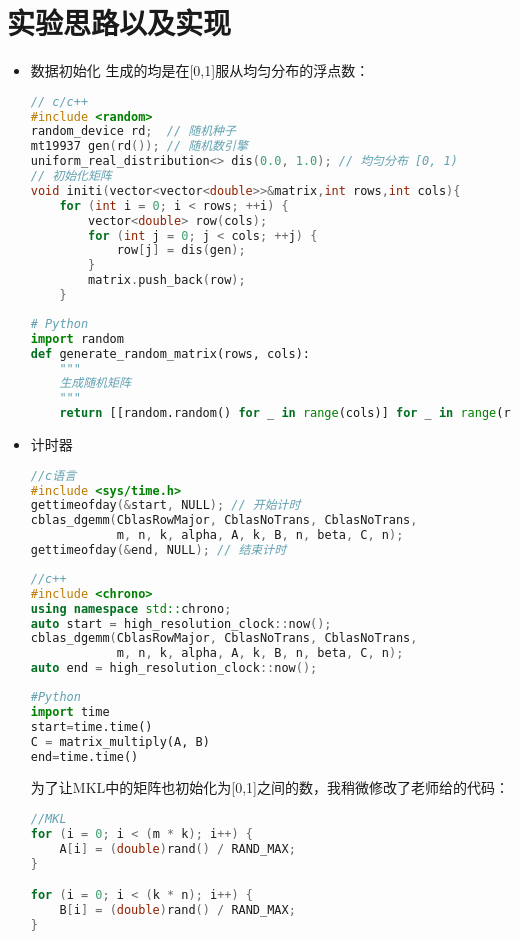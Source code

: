 \documentclass{SYSUReport}
\begin{document}
\section{实验思路以及实现}
\begin{itemize}
    \item 数据初始化
    生成的均是在[0,1]服从均匀分布的浮点数：
    \begin{lstlisting}[language=c]
// c/c++
#include <random>
random_device rd;  // 随机种子
mt19937 gen(rd()); // 随机数引擎
uniform_real_distribution<> dis(0.0, 1.0); // 均匀分布 [0, 1)
// 初始化矩阵
void initi(vector<vector<double>>&matrix,int rows,int cols){
    for (int i = 0; i < rows; ++i) {
        vector<double> row(cols);
        for (int j = 0; j < cols; ++j) {
            row[j] = dis(gen); 
        }
        matrix.push_back(row);
    }
    \end{lstlisting}
    \begin{lstlisting}[language=Python]
# Python
import random
def generate_random_matrix(rows, cols):
    """
    生成随机矩阵
    """
    return [[random.random() for _ in range(cols)] for _ in range(rows)]
    \end{lstlisting}

    \item 计时器

    \begin{lstlisting}[language=c]
//c语言
#include <sys/time.h>
gettimeofday(&start, NULL); // 开始计时
cblas_dgemm(CblasRowMajor, CblasNoTrans, CblasNoTrans,
            m, n, k, alpha, A, k, B, n, beta, C, n);
gettimeofday(&end, NULL); // 结束计时
    \end{lstlisting}
    \begin{lstlisting}[language=c++]
//c++
#include <chrono>
using namespace std::chrono;
auto start = high_resolution_clock::now();
cblas_dgemm(CblasRowMajor, CblasNoTrans, CblasNoTrans,
            m, n, k, alpha, A, k, B, n, beta, C, n);
auto end = high_resolution_clock::now();
    \end{lstlisting}
\begin{lstlisting}[language=Python]
#Python
import time
start=time.time()
C = matrix_multiply(A, B)
end=time.time()
    \end{lstlisting}
为了让MKL中的矩阵也初始化为[0,1]之间的数，我稍微修改了老师给的代码：
\begin{lstlisting}[language=c]
//MKL
for (i = 0; i < (m * k); i++) {
    A[i] = (double)rand() / RAND_MAX;
}

for (i = 0; i < (k * n); i++) {
    B[i] = (double)rand() / RAND_MAX;
}


\end{lstlisting}
\end{itemize}
\end{document}
